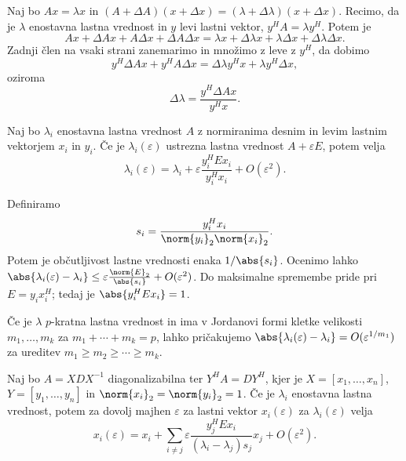
Naj bo $Ax = \lambda x$ in $(A + \Delta A)(x + \Delta x) = (\lambda + \Delta
\lambda)(x + \Delta x)$.
Recimo, da je $\lambda$ enostavna lastna vrednost in $y$ levi lastni vektor,
$y^H A = \lambda y^H$.
Potem je
\[
  Ax + \Delta A x + A \Delta x + \Delta A \Delta x = \lambda x + \Delta \lambda
  x + \lambda \Delta x + \Delta \lambda \Delta x.
\]
Zadnji člen na vsaki strani zanemarimo in množimo z leve z $y^H$, da dobimo
\[
  y^H \Delta A x + y^H A \Delta x = \Delta \lambda y^H x + \lambda y^H \Delta x,
\]
oziroma
\[
  \Delta \lambda = \frac{y^H \Delta A x}{y^H x}.
\]


\begin{izrek}
  Naj bo $\lambda_i$ enostavna lastna vrednost $A$ z normiranima desnim in levim
  lastnim vektorjem $x_i$ in $y_i$.
  Če je $\lambda_i(\varepsilon)$ ustrezna lastna vrednost $A + \varepsilon E$,
  potem velja
  \[
	\lambda_i(\varepsilon) = \lambda_i + \varepsilon \frac{y_i^H E x_i}{y_i^H
	  x_i} + O(\varepsilon^2).
  \]
\end{izrek}

Definiramo
\[
  s_i = \frac{y_i^H x_i}{\norm{y_i}_2 \norm{x_i}_2}.
\]
Potem je občutljivost lastne vrednosti enaka $1/\abs{s_i}$.
Ocenimo lahko $\abs{\lambda_i(\varepsilon) - \lambda_i} \le \varepsilon
\frac{\norm{E}_2}{\abs{s_i}} + O(\varepsilon^2)$.
Do maksimalne spremembe pride pri $E = y_i x_i^H$; tedaj je $\abs{y_i^H E x_i} =
1$.


Če je $\lambda$ $p$-kratna lastna vrednost in ima v Jordanovi formi kletke
velikosti $m_1, \ldots, m_k$ za $m_1 + \cdots + m_k = p$, lahko pričakujemo
$\abs{\lambda_i(\varepsilon) - \lambda_i} = O(\varepsilon^{1/m_1})$ za ureditev
$m_1 \ge m_2 \ge \cdots \ge m_k$.

\begin{izrek}
  Naj bo $A = X D X^{-1}$ diagonalizabilna ter $Y^H A = D Y^H$, kjer je $X =
  [x_1, \ldots, x_n]$, $Y = [y_1, \ldots, y_n]$ in $\norm{x_i}_2 = \norm{y_i}_2
  = 1$.
  Če je $\lambda_i$ enostavna lastna vrednost, potem za dovolj majhen
  $\varepsilon$ za lastni vektor $x_i(\varepsilon)$ za $\lambda_i(\varepsilon)$
  velja
  \[
	x_i(\varepsilon) = x_i + \sum_{i \ne j} \varepsilon \frac{y_j^H E
	  x_i}{(\lambda_i - \lambda_j) s_j} x_j + O(\varepsilon^2).
  \]
\end{izrek}

